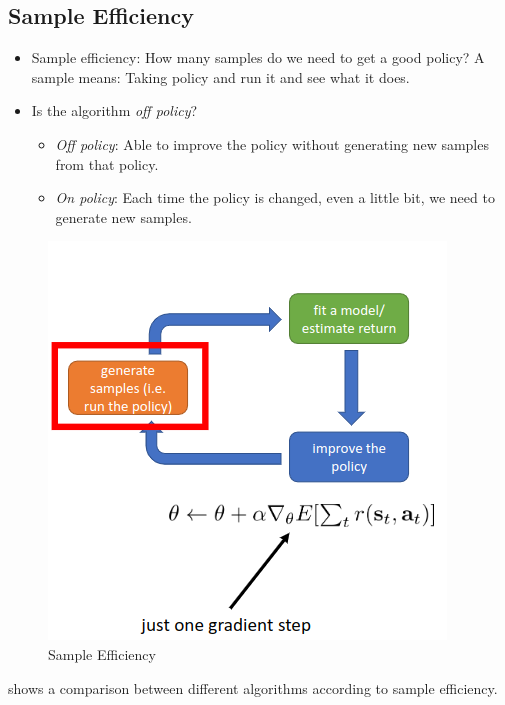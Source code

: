 \documentclass[]{article}
\begin{document}
\subsection*{Sample Efficiency}%
\label{sub:Sample Efficiency}

\begin{itemize}
    \item Sample efficiency: How many samples do we need to get a good policy? A sample means: Taking policy and run it
        and see what it does. 
    \item Is the algorithm \textit{off policy}?
        \begin{itemize}
            \item \textit{Off policy}: Able to improve the policy without generating new samples from that policy.
            \item \textit{On policy}: Each time the policy is changed, even a little bit, we need to generate new
                samples.
        \end{itemize}
\end{itemize}

\begin{figure}
\begin{center}
    \includegraphics[scale=0.5]{cap3img/sample.png}
\end{center}
\caption{Sample Efficiency}
\label{fig:sample}
\end{figure}


 shows a comparison between different algorithms according to sample efficiency.
\end{document}
